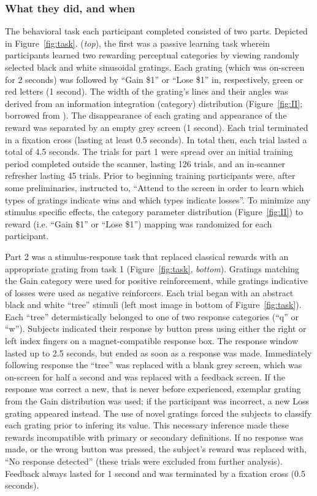 \documentclass[doc,12pt]{apa}        %
\begin{document}
\subsubsection{What they did, and when}
\label{subsub:whatwhen}
The behavioral task each participant completed consisted of two parts.  Depicted in Figure~\ref{fig:task}. (\emph{top}), the first was a passive learning task wherein participants learned two rewarding perceptual categories by viewing randomly selected black and white sinusoidal gratings.  Each grating (which was on-screen for 2 seconds) was followed by ``Gain \$1'' or ``Lose \$1'' in, respectively, green or red letters (1 second).  The width of the grating's lines and their angles was derived from an information integration (category) distribution (Figure~\ref{fig:II}; borrowed from ).  The disappearance of each grating and appearance of the reward was separated by an empty grey screen (1 second).  Each trial terminated in a fixation cross (lasting at least 0.5 seconds). In total then, each trial lasted a total of 4.5 seconds.  The trials for part 1 were spread over an initial training period completed outside the scanner, lasting 126 trials, and an in-scanner refresher lasting 45 trials.  Prior to beginning training participants were, after some preliminaries, instructed to, ``Attend to the screen in order to learn which types of gratings indicate wins and which types indicate losses''.  To minimize any stimulus specific effects, the category parameter distribution (Figure~\ref{fig:II}) to reward (i.e. ``Gain \$1'' or ``Lose \$1'') mapping was randomized for each participant.

Part 2 was a stimulus-response task that replaced classical rewards with an appropriate grating from task 1 (Figure~\ref{fig:task}, \emph{bottom}).  Gratings matching the Gain category were used for positive reinforcement, while gratings indicative of losses were used as negative reinforcers.   Each trial began with an abstract black and white ``tree'' stimuli (left most image in bottom of Figure~\ref{fig:task}).  Each ``tree'' determistically belonged to one of two response categories (``q'' or ``w'').  Subjects indicated their response by button press using either the right or left index fingers on a magnet-compatible response box.  The response window lasted up to 2.5 seconds, but ended as soon as a response was made.  Immediately following response the ``tree'' was replaced with a blank grey screen, which was on-screen for half a second and was replaced with a feedback screen.  If the response was correct a new, that is never before experienced, exemplar grating from the Gain distribution was used; if the participant was incorrect, a new Loss grating appeared instead.  The use of novel gratings forced the subjects to classify each grating prior to infering its value.  This necessary inference made these rewards incompatible with primary or secondary definitions.  If no response was made, or the wrong button was pressed, the subject's reward was replaced with, ``No response detected'' (these trials were excluded from further analysis).  Feedback always lasted for 1 second and was terminated by a fixation cross (0.5 seconds).  
\end{document}
